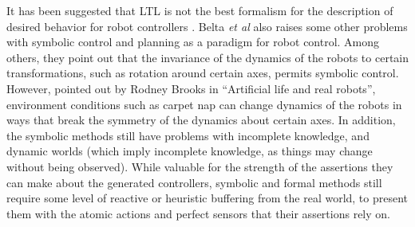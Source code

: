 %	
%			
It has been suggested that LTL is not the best formalism for the description of desired behavior for robot controllers \citep{belta2007symbolic}.
Belta \emph{et al} also raises some other problems with symbolic control and planning as a paradigm for robot control. 
Among others, they point out that the invariance of the dynamics of the robots to certain transformations, such as rotation around certain axes, permits symbolic control. 
However, pointed out by Rodney Brooks in ``Artificial life and real robots'', environment conditions such as carpet nap can change dynamics of the robots in ways that break the symmetry of the dynamics about certain axes\cite{brooks1992artificial}.
In addition, the symbolic methods still have problems with incomplete knowledge, and dynamic worlds (which imply incomplete knowledge, as things may change without being observed). 
While valuable for the strength of the assertions they can make about the generated controllers, symbolic and formal methods still require some level of reactive or heuristic buffering from the real world, to present them with the atomic actions and perfect sensors that their assertions rely on. 

